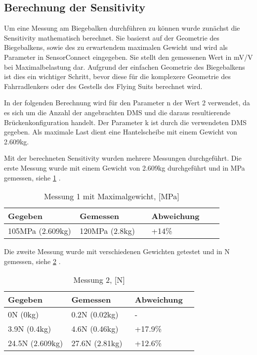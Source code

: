 \subsection{Berechnung der Sensitivity}
Um eine Messung am Biegebalken durchführen zu können wurde zunächst die Sensitivity mathematisch berechnet.
Sie basierst auf der Geometrie des Biegebalkens, sowie des zu erwartendem maximalen Gewicht und wird als Parameter in SensorConnect eingegeben.
Sie stellt den gemessenen Wert in mV/V bei Maximalbelastung dar.
Aufgrund der einfachen Geometrie des Biegebalkens ist dies ein wichtiger Schritt, bevor diese für die komplexere Geometrie des Fahrradlenkers oder des Gestells des Flying Suits berechnet wird.

In der folgenden Berechnung wird für den Parameter n der Wert 2 verwendet, da es sich um die Anzahl der angebrachten DMS und die daraus resultierende Brückenkonfiguration handelt.
Der Parameter k ist durch die verwendeten DMS gegeben. Als maximale Last dient eine Hantelscheibe mit einem Gewicht von 2.609kg.



Mit der berechneten Sensitivity wurden mehrere Messungen durchgeführt.
Die erste Messung wurde mit einem Gewicht von 2.609kg durchgeführt und in MPa gemessen, siehe \ref{tbl:biegebalkenmessungeins} .

\bgroup
\def\arraystretch{2}
\begin{table}[h]
\centering
\begin{tabular}{|p{0.33\linewidth}|p{0.33\linewidth}|p{0.33\linewidth}|}
\hline
Gegeben & Gemessen & Abweichung \\ \hline
105MPa (2.609kg) & 120MPa (2.8kg) & +14\% \\ \hline
\end{tabular}
\caption{Messung 1 mit Maximalgewicht, [MPa]}
\label{tbl:biegebalkenmessungeins}

\end{table}
\egroup

Die zweite Messung wurde mit verschiedenen Gewichten getestet und in N gemessen, siehe \ref{tbl:biegebalkenmessungzwei} .
\bgroup
\def\arraystretch{2}
\begin{table}[h]
\centering
\begin{tabular}{|p{0.33\linewidth}|p{0.33\linewidth}|p{0.33\linewidth}|}
\hline
Gegeben & Gemessen & Abweichung \\ \hline
0N (0kg) & 0.2N (0.02kg) & - \\ \hline
3.9N (0.4kg) & 4.6N (0.46kg) & +17.9\%  \\ \hline
24.5N (2.609kg) & 27.6N (2.81kg)  & +12.6\% \\ \hline
\end{tabular}
\caption{Messung 2, [N]}
\label{tbl:biegebalkenmessungzwei}

\end{table}
\egroup

